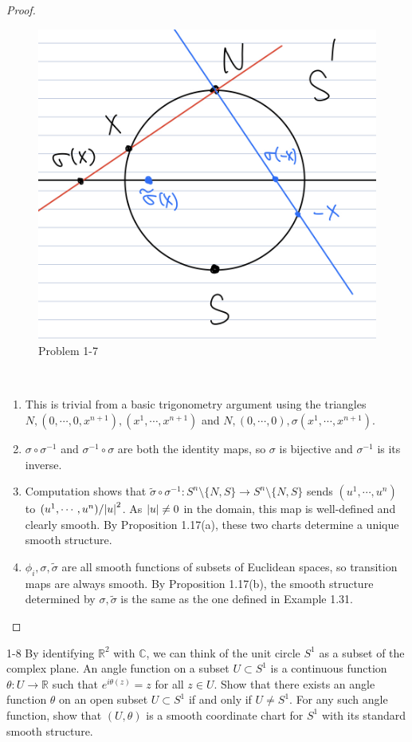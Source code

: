 \begin{proof}
  \begin{figure}[!htb]
    \includegraphics[width=.5\linewidth]{img/problem_1_7.jpeg}
    \caption{Problem 1-7}
    \label{fig:problem_1_7}
  \end{figure}
  $ $
  \begin{enumerate}[label=(\alph*)]
    \item 
      This is trivial from a basic trigonometry argument using the triangles $N, (0, \cdots, 0, x^{n + 1}), (x^1, \cdots, x^{n + 1})$ and $N, (0, \cdots, 0), \sigma(x^1, \cdots, x^{n + 1})$.
    \item
      $\sigma \circ \sigma^{-1}$ and $\sigma^{-1} \circ \sigma$ are both the identity maps, so $\sigma$ is bijective and $\sigma^{-1}$ is its inverse.
    \item
      Computation shows that $\tilde{\sigma} \circ \sigma^{-1}: S^n \setminus \{ N, S \} \rightarrow S^n \setminus \{ N, S \}$ sends $(u^1, \cdots, u^n)$ to $(u^1, \cdots, u^n) / \abs{u}^2$.
      As $\abs{u} \ne 0$ in the domain, this map is well-defined and clearly smooth.
      By Proposition 1.17(a), these two charts determine a unique smooth structure.
    \item
      $\phi_i, \sigma, \tilde{\sigma}$ are all smooth functions of subsets of Euclidean spaces, so transition maps are always smooth.
      By Proposition 1.17(b), the smooth structure determined by $\sigma, \tilde{\sigma}$ is the same as the one defined in Example 1.31.
  \end{enumerate}
\end{proof}

\begin{customprob}{1-8}
  By identifying $\mathbb{R}^2$ with $\mathbb{C}$, we can think of the unit circle $S^1$ as a subset of the complex plane.
  An angle function on a subset $U \subset S^1$ is a continuous function $\theta: U \rightarrow \mathbb{R}$ such that $e^{i\theta(z)} = z$ for all $z \in U$.
  Show that there exists an angle function $\theta$ on an open subset $U \subset S^1$ if and only if $U \ne S^1$.
  For any such angle function, show that $(U, \theta)$ is a smooth coordinate chart for $S^1$ with its standard smooth structure.
\end{customprob}

